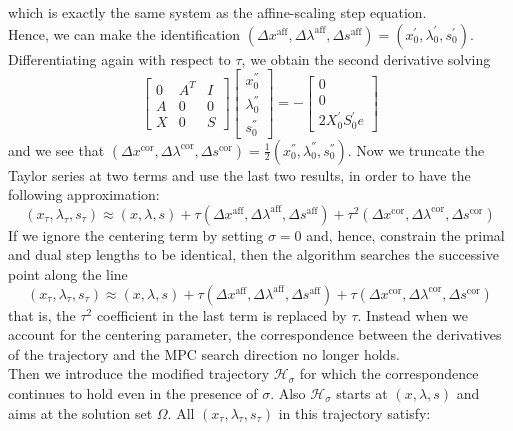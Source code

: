 \documentclass[a4paper,10 pt,titlepage,twoside]{book}
\theoremstyle{plain}
\theoremstyle{definition}
\theoremstyle{remark}
\begin{document}
which is exactly the same system as the affine-scaling step equation.\\
Hence, we can make the identification $(\Delta x^{\text{aff}},\Delta \lambda^{\text{aff}},\Delta s^{\text{aff}})=(x^{'}_{0},\lambda^{'}_{0},s^{'}_{0})$. Differentiating again with respect to $\tau$, we obtain the second derivative solving
\begin{equation}
\begin{bmatrix}
0&A^{T}&I \\A&0&0\\X&0&S
\end{bmatrix}\begin{bmatrix}
x_{0}^{''}\\\lambda_{0}^{''}\\s_{0}^{''}
\end{bmatrix}=-\begin{bmatrix}
0\\0\\2X^{'}_{0}S^{'}_{0}e
\end{bmatrix}
\end{equation}
and we see that $(\Delta x^{\text{cor}},\Delta \lambda^{\text{cor}},\Delta s^{\text{cor}})=\frac{1}{2}(x^{''}_{0},\lambda^{''}_{0},s^{''}_{0})$. Now we truncate the Taylor series at two terms and use the last two results, in order to have the following approximation:
\begin{equation}
(x_{\tau},\lambda_{\tau}, s_{\tau})\approx(x, \lambda, s)+ \tau(\Delta x^{\text{aff}},\Delta \lambda^{\text{aff}},\Delta s^{\text{aff}})+\tau^{2}(\Delta x^{\text{cor}},\Delta \lambda^{\text{cor}},\Delta s^{\text{cor}})
\end{equation}
If we ignore the centering term  by setting $\sigma =0$ and, hence, constrain the primal and dual step lengths to be identical, then the algorithm searches the successive point along the line
\begin{equation}
(x_{\tau},\lambda_{\tau}, s_{\tau})\approx(x, \lambda, s)+ \tau(\Delta x^{\text{aff}},\Delta \lambda^{\text{aff}},\Delta s^{\text{aff}})+\tau(\Delta x^{\text{cor}},\Delta \lambda^{\text{cor}},\Delta s^{\text{cor}})
\end{equation} 
that is, the $\tau^{2}$ coefficient in the last term is replaced by $\tau$. Instead when we account for the centering parameter, the correspondence between the derivatives of the trajectory and the MPC search direction no longer holds. \\
Then we introduce the modified trajectory $\mathcal{H}_{\sigma}$ for which the correspondence continues to hold even in the presence of $\sigma$. Also $\mathcal{H}_{\sigma}$ starts at $(x, \lambda, s)$ and aims at the solution set $\Omega$. All $(x_{\tau},\lambda_{\tau},s_{\tau})$ in this trajectory satisfy:
\end{document}
